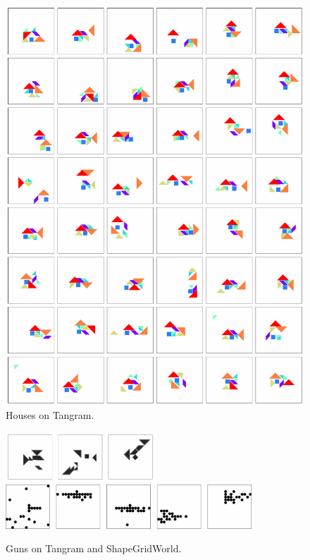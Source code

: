 \begin{figure}[H]
    \centering
    \includegraphics[width=\textwidth]{images/curation_house.pdf}
    \caption{Houses on Tangram.}
    \label{fig:curation_house}
\end{figure}

\begin{figure}[H]
    \centering
    \includegraphics[width=0.5\textwidth]{images/curation_gun_all.pdf}
    \includegraphics[width=0.824\textwidth]{images/curation_sgw_objects_cropped.pdf}
    \caption{Guns on Tangram and ShapeGridWorld.}
    \label{fig:curation_gun_all}
\end{figure}

